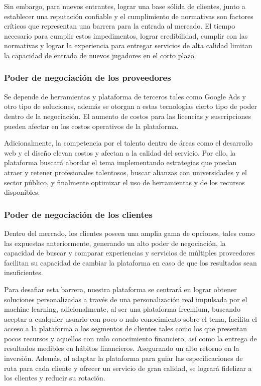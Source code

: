 Sin embargo, para nuevos entrantes, lograr una base sólida de clientes, junto a establecer una reputación confiable y el cumplimiento de normativas son factores críticos que representan una barrera para la entrada al mercado. El tiempo necesario para cumplir estos impedimentos, lograr credibilidad, cumplir con las normativas y lograr la experiencia para entregar servicios de alta calidad limitan la capacidad de entrada de nuevos jugadores en el corto plazo.

{}
\subsubsection*{Poder de negociación de los proveedores}

Se depende de herramientas y plataforma de terceros tales como Google Ads y otro tipo de soluciones, además se otorgan a estas tecnologías cierto tipo de poder dentro de la negociación. El aumento de costos para las licencias y suscripciones pueden afectar en los costos operativos de la plataforma.

Adicionalmente, la competencia por el talento dentro de áreas como el desarrollo web y el diseño elevan costos y afectan a la calidad del servicio. Por ello, la plataforma buscará abordar el tema implementando estrategias que puedan atraer y retener profesionales talentosos, buscar alianzas con universidades y el sector público, y finalmente optimizar el uso de herramientas y de los recursos disponibles.

{}
\subsubsection*{Poder de negociación de los clientes}

Dentro del mercado, los clientes poseen una amplia gama de opciones, tales como las expuestas anteriormente, generando un alto poder de negociación, la capacidad de buscar y comparar experiencias y servicios de múltiples proveedores facilitan su capacidad de cambiar la plataforma en caso de que los resultados sean insuficientes.

Para desafiar esta barrera, nuestra plataforma se centrará en lograr obtener soluciones personalizadas a través de una personalización real impulsada por el machine learning,  adicionalmente, al ser una plataforma freemium, buscando aceptar a cualquier usuario con poco o nulo conocimiento sobre el tema, facilita el acceso a la plataforma a los segmentos de clientes tales como los que presentan pocos recursos y aquellos con nulo conocimiento financiero, así como la entrega de resultados medibles en hábitos financieros. Asegurando un alto retorno en la inversión. Además, al adaptar la plataforma para guiar las especificaciones de ruta para cada cliente y ofrecer un servicio de gran calidad, se logrará fidelizar a los clientes y reducir su rotación.

